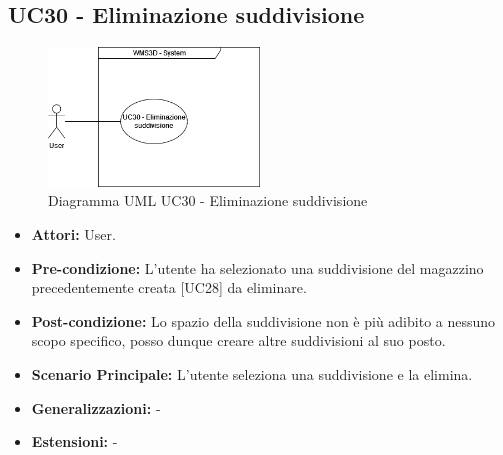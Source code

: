 \subsection{UC30 - Eliminazione suddivisione}
\begin{figure}[H]
  \centering
  \includegraphics[width=0.5\textwidth]{UC_diagrams_28-32/UC30_sys.drawio.png}
  \caption{Diagramma UML UC30 - Eliminazione suddivisione}
\end{figure}
\begin{itemize}
    \item \textbf{Attori:} User.
    \item \textbf{Pre-condizione:} L'utente ha selezionato una suddivisione del magazzino precedentemente creata [UC28] da eliminare.
    \item \textbf{Post-condizione:} Lo spazio della suddivisione non è più adibito a nessuno scopo specifico, posso dunque creare altre suddivisioni al suo posto.
    \item \textbf{Scenario Principale:} L'utente seleziona una suddivisione e la elimina.
    \item \textbf{Generalizzazioni:} -
    \item \textbf{Estensioni:} -
\end{itemize}